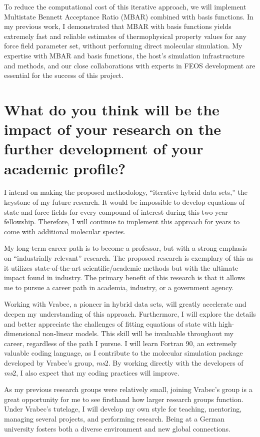 \documentclass[12pt]{article}
\begin{document}
	To reduce the computational cost of this iterative approach, we will implement Multistate Bennett Acceptance Ratio (MBAR) combined with basis functions. In my previous work, I demonstrated that MBAR with basis functions yields extremely fast and reliable estimates of thermophysical property values for any force field parameter set, without performing direct molecular simulation. My expertise with MBAR and basis functions, the host's simulation infrastructure and methods, and our close collaborations with experts in FEOS development are essential for the success of this project.
	
	\section*{What do you think will be the impact of your research on the further development of your academic profile?}
	
	I intend on making the proposed methodology, ``iterative hybrid data sets,'' the keystone of my future research. It would be impossible to develop equations of state and force fields for every compound of interest during this two-year fellowship. Therefore, I will continue to implement this approach for years to come with additional molecular species.
	
	My long-term career path is to become a professor, but with a strong emphasis on ``industrially relevant'' research. The proposed research is exemplary of this as it utilizes state-of-the-art scientific/academic methods but with the ultimate impact found in industry. The primary benefit of this research is that it allows me to pursue a career path in academia, industry, or a government agency.
	
	Working with Vrabec, a pioneer in hybrid data sets, will greatly accelerate and deepen my understanding of this approach. Furthermore, I will explore the details and better appreciate the challenges of fitting equations of state with high-dimensional non-linear models. This skill will be invaluable throughout my career, regardless of the path I pursue. I will learn Fortran 90, an extremely valuable coding language, as I contribute to the molecular simulation package developed by Vrabec's group, \textit{ms}2. By working directly with the developers of \textit{ms}2, I also expect that my coding practices will improve.
	
	As my previous research groups were relatively small, joining Vrabec's group is a great opportunity for me to see firsthand how larger research groups function. Under Vrabec's tutelage, I will develop my own style for teaching, mentoring, managing several projects, and performing research. Being at a German university fosters both a diverse environment and new global connections.
		
\end{document}
